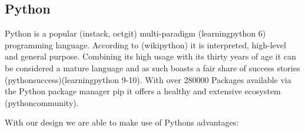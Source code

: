 \hypertarget{python}{%
\subsection{Python}\label{python}}

Python is a popular (instack, octgit) multi-paradigm (learningpython 6)
programming language. According to (wikipython) it is interpreted,
high-level and general purpose. Combining its high usage with its thirty
years of age it can be considered a mature language and as such boasts a
fair share of success stories (pythonsuccess)(learningpython 9-10). With
over 280000 Packages available via the Python package manager pip it
offers a healthy and extensive ecosystem (pythoncommunity).

With our design we are able to make use of Pythons advantages:

